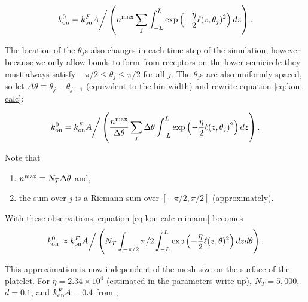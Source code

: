 \documentclass{article}
\newcommand{\tn}{\textnormal}
\begin{document}
\begin{equation}
  \label{eq:kon-calc}
  k_\tn{on}^0 = k_\tn{on}^F A \bigg/ \left( n^\tn{max} \sum_j \int_{-L}^{L}
    \exp \left(-\frac{\eta}{2} \ell(z, \theta_j)^2 \right) dz \right).
\end{equation}

The location of the $\theta_j$s also changes in each time step of the
simulation, however because we only allow bonds to form from receptors
on the lower semicircle they must always satisfy $-\pi/2 \le \theta_j
\le \pi/2$ for all $j$. The $\theta_j$s are also uniformly spaced, so
let $\Delta \theta \equiv \theta_j - \theta_{j-1}$ (equivalent to the
bin width) and rewrite equation \eqref{eq:kon-calc}:

\begin{equation}
  \label{eq:kon-calc-reimann}
  k_\tn{on}^0 = k_\tn{on}^F A \bigg/ \left(\frac{n^\tn{max}}{\Delta
      \theta} \sum_j \Delta \theta \int_{-L}^{L}
    \exp\left(-\frac{\eta}{2} \ell(z, \theta_j)^2 \right) dz \right).
\end{equation}

Note that
\begin{enumerate}
\item $n^\tn{max} \equiv N_T \Delta \theta$ and,
\item the sum over $j$ is a Riemann sum over $[-\pi/2, \pi/2]$
  (approximately). 
\end{enumerate}
With these observations, equation \eqref{eq:kon-calc-reimann} becomes
\begin{equation}
  \label{eq:kon-calc-int}
  k_\tn{on}^0 \approx k_\tn{on}^F A \bigg/ \left(N_T
    \int_{-\pi/2}{\pi/2} \int_{-L}^{L} \exp \left(-\frac{\eta}{2}
      \ell(z, \theta)^2 \right) dz d\theta \right).
\end{equation}

This approximation is now independent of the mesh size on the surface
of the platelet. For $\eta = 2.34 \times 10^4$ (estimated in the
parameters write-up), $N_T = 5,000$, $d = 0.1$, and $k_\tn{on}^F A = 0.4$ from
\cite{Fitzgibbon2014}, 



\end{document}
